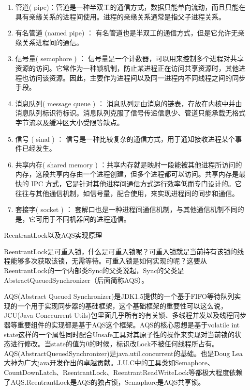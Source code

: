 \documentclass[8pt]{book}
\makeatletter
\numberwithin{dummy}{section}
\theoremstyle{ocrenumbox}
\theoremstyle{blacknumex}
\theoremstyle{blacknumbox}
\theoremstyle{ocrenum}
\renewcommand\paragraph{\@startsection{paragraph}{4}{\z@}
	{-2ex \@plus-.2ex \@minus .2ex}
	{.1ex}
	{\normalfont\small\sffamily\bfseries}}
\makeatother
\begin{document}
\begin{enumerate}
\item {管道( pipe)：管道是一种半双工的通信方式，数据只能单向流动，而且只能在具有亲缘关系的进程间使用。进程的亲缘关系通常是指父子进程关系。}
\item{有名管道 (named pipe) ： 有名管道也是半双工的通信方式，但是它允许无亲缘关系进程间的通信。}
\item{信号量( semophore ) ： 信号量是一个计数器，可以用来控制多个进程对共享资源的访问。它常作为一种锁机制，防止某进程正在访问共享资源时，其他进程也访问该资源。因此，主要作为进程间以及同一进程内不同线程之间的同步手段。}
\item{消息队列( message queue ) ： 消息队列是由消息的链表，存放在内核中并由消息队列标识符标识。消息队列克服了信号传递信息少、管道只能承载无格式字节流以及缓冲区大小受限等缺点。}
\item{信号 ( sinal ) ： 信号是一种比较复杂的通信方式，用于通知接收进程某个事件已经发生。}
\item{共享内存( shared memory ) ：共享内存就是映射一段能被其他进程所访问的内存，这段共享内存由一个进程创建，但多个进程都可以访问。共享内存是最快的 IPC 方式，它是针对其他进程间通信方式运行效率低而专门设计的。它往往与其他通信机制，如信号量，配合使用，来实现进程间的同步和通信。}
\item{套接字( socket ) ： 套解口也是一种进程间通信机制，与其他通信机制不同的是，它可用于不同机器间的进程通信。}
\end{enumerate}


\paragraph{ReentrantLock以及AQS实现原理}

ReentrantLock是可重入锁，什么是可重入锁呢？可重入锁就是当前持有该锁的线程能够多次获取该锁，无需等待。可重入锁是如何实现的呢？这要从ReentrantLock的一个内部类Sync的父类说起，Sync的父类是AbstractQueuedSynchronizer（后面简称AQS）。

AQS(Abstract Queued Synchronizer)是JDK1.5提供的一个基于FIFO等待队列实现的一个用于实现同步器的基础框架，这个基础框架的重要性可以这么说，JCU(Java Conccurrent Utils)包里面几乎所有的有关锁、多线程并发以及线程同步器等重要组件的实现都是基于AQS这个框架。AQS的核心思想是基于volatile int state这样的一个属性同时配合Unsafe工具对其原子性的操作来实现对当前锁的状态进行修改。当state的值为0的时候，标识改Lock不被任何线程所占有。AQS(AbstractQueuedSynchronizer)是java.util.concurrent的基础。也是Doug Lea大神为广大java开发作出的卓越贡献。J.U.C中的工具类如Semaphore、CountDownLatch、ReentrantLock、ReentrantReadWriteLock等都极大程度依赖了AQS.ReentrantLock是AQS的独占锁，Semaphore是AQS共享锁。
\end{document}
